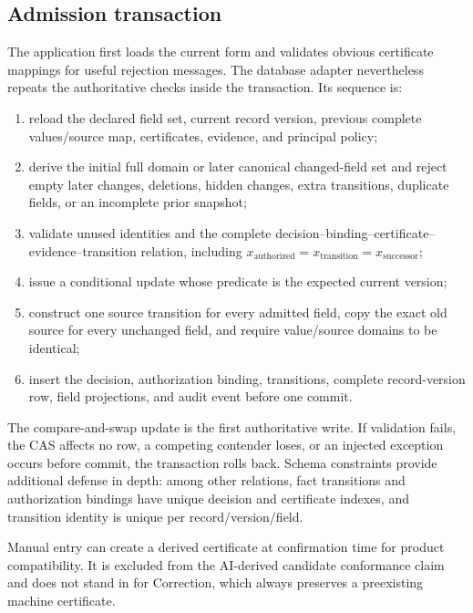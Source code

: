\subsection{Admission transaction}

The application first loads the current form and validates obvious certificate mappings for useful rejection messages. The database adapter nevertheless repeats the authoritative checks inside the transaction. Its sequence is:

\begin{enumerate}[leftmargin=*]
  \item reload the declared field set, current record version, previous complete values/source map, certificates, evidence, and principal policy;
  \item derive the initial full domain or later canonical changed-field set and reject empty later changes, deletions, hidden changes, extra transitions, duplicate fields, or an incomplete prior snapshot;
  \item validate unused identities and the complete decision--binding--certificate--evidence--transition relation, including
  $x_{\mathrm{authorized}}=x_{\mathrm{transition}}=x_{\mathrm{successor}}$;
  \item issue a conditional update whose predicate is the expected current version;
  \item construct one source transition for every admitted field, copy the exact old source for every unchanged field, and require value/source domains to be identical;
  \item insert the decision, authorization binding, transitions, complete record-version row, field projections, and audit event before one commit.
\end{enumerate}

The compare-and-swap update is the first authoritative write. If validation fails, the CAS affects no row, a competing contender loses, or an injected exception occurs before commit, the transaction rolls back. Schema constraints provide additional defense in depth: among other relations, fact transitions and authorization bindings have unique decision and certificate indexes, and transition identity is unique per record/version/field.

Manual entry can create a derived certificate at confirmation time for product compatibility. It is excluded from the AI-derived candidate conformance claim and does not stand in for Correction, which always preserves a preexisting machine certificate.


